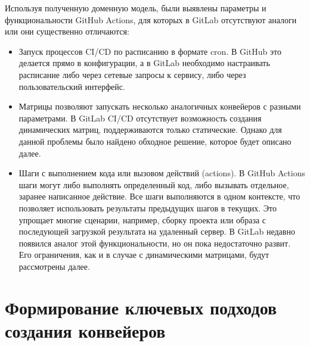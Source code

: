 Используя полученную доменную модель, были выявлены параметры и функциональности GitHub Actions, для которых в GitLab отсутствуют аналоги или они существенно отличаются:
\begin{itemize}
  \item Запуск процессов CI/CD по расписанию в формате cron.
        В GitHub это делается прямо в конфигурации, а в GitLab необходимо настраивать расписание либо через сетевые запросы к сервису,
        либо через пользовательский интерфейс.
  \item Матрицы позволяют запускать несколько аналогичных конвейеров с разными параметрами.
        В GitLab CI/CD отсутствует возможность создания динамических матриц, поддерживаются только статические.
        Однако для данной проблемы было найдено обходное решение, которое будет описано далее.
  \item Шаги с выполнением кода или вызовом действий (actions).
        В GitHub Actions шаги могут либо выполнять определенный код, либо вызывать отдельное, заранее написанное действие.
        Все шаги выполняются в одном контексте, что позволяет использовать результаты предыдущих шагов в текущих.
        Это упрощает многие сценарии, например, сборку проекта или образа с последующей загрузкой результата на удаленный сервер.
        В GitLab недавно появился аналог этой функциональности, но он пока недостаточно развит.
        Его ограничения, как и в случае с динамическими матрицами, будут рассмотрены далее.
\end{itemize}

\section{Формирование ключевых подходов создания конвейеров}
